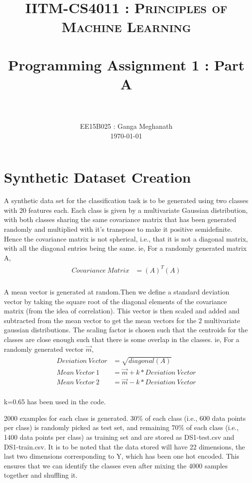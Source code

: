 \documentclass[paper=a4, fontsize=11pt]{scrartcl}
\title{
		\usefont{OT1}{bch}{b}{n}
		\normalfont \normalsize \textsc{IITM-CS4011 : Principles of Machine Learning} \\ [25pt]
		\horrule{0.5pt} \\[0.4cm]
		\huge Programming Assignment 1 : Part A \\
		\horrule{2pt} \\[0.5cm]
}
\author{
		\normalfont 								\normalsize
        EE15B025 : Ganga Meghanath\\[-3pt]		\normalsize
        \today
}
\date{}
\numberwithin{equation}{section}		%
\numberwithin{figure}{section}			%
\numberwithin{table}{section}				%
\begin{document}
\maketitle
\section{Synthetic Dataset Creation}
A synthetic data set for the classification task is to be generated using two classes with 20 features each. Each class is given by a multivariate Gaussian distribution, with both classes sharing the same covariance matrix that has been generated randomly and multiplied with it's transpose to make it positive semidefinite. Hence the covariance matrix is not spherical, i.e., that it is not a diagonal matrix, with all the diagonal entries being the same. ie, For a randomly generated matrix A,
\begin{align} 
	\begin{split}
	 	Covariance\ Matrix &= (A)^{T}(A)\\
	\end{split}					
\end{align}

A mean vector is generated at random.Then we define a standard deviation vector by taking the square root of the diagonal elements of the covariance matrix (from the idea of correlation). This vector is then scaled and added and subtracted from the mean vector to get the mean vectors for the 2 multivariate gaussian distributions. The scaling factor is chosen such that the centroids for the classes are close enough such that there is some overlap in the classes. ie, For a randomly generated vector $\vec{m}$,
\begin{align} 
	\begin{split}
	Deviation\ Vector 	&= \sqrt{diagonal(A)}\\
	Mean\ Vector\ 1	&=\vec{m} + k*Deviation\ Vector\\
	Mean\ Vector\ 2	&=\vec{m} - k*Deviation\ Vector	\\
	\end{split}					
\end{align}

k=0.65 has been used in the code.


2000 examples for each class is generated. 30\%  of each class (i.e., 600 data points per class) is randomly picked as test set, and remaining 70\% of each class (i.e., 1400 data points per class) as training set and are stored as DS1-test.csv and DS1-train.csv. It is to be noted that the data stored will have 22 dimensions, the last two dimensions corresponding to Y, which has been one hot encoded. This ensures that we can identify the classes even after mixing the 4000 samples together and shuffling it.
\end{document}
